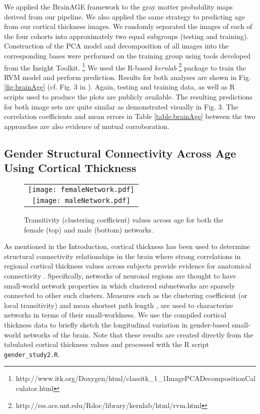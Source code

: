 We applied the BrainAGE framework to the gray matter probability maps derived
from our pipeline.  We also applied the same strategy to predicting age from 
our cortical thickness images.  We randomly separated the images of each of the 
four cohorts into approximately two equal subgroups (testing and training).
Construction of the PCA model and decomposition of all images into the corresponding 
bases were performed on the training group using tools developed from the Insight Toolkit.%
\footnote{
http://www.itk.org/Doxygen/html/classitk\_1\_1ImagePCADecompositionCalculator.html  
}
We used the R-based {\it kernlab}%
\footnote{
http://rss.acs.unt.edu/Rdoc/library/kernlab/html/rvm.html
} 
package to train the RVM model and perform prediction.  Results for both
analyses  are shown in Fig. \ref{fig:brainAge} (cf. Fig. 3 in \cite{franke2010}).
Again, testing and training data, as well as 
R scripts used to produce the 
plots are publicly available.  
The resulting predictions for both image sets are quite similar as demonstrated 
visually in Fig. 3.  The correlation coefficients and mean errors in Table 
\ref{table:brainAge} between the
two approaches are also evidence of mutual corroboration.

\subsection{Gender Structural Connectivity Across Age Using Cortical Thickness}

\begin{figure*}
  \centering
  \begin{tabular}{c}
  \texttt{[image: femaleNetwork.pdf]} \\
  \texttt{[image: maleNetwork.pdf]}
  \end{tabular}
  \caption{Transitivity (clustering coefficient) values across age for both the female (top)
  and male (bottom) networks.  
  }
  \label{fig:network}
\end{figure*}

As mentioned in the Introduction, cortical thickness has
been used to determine structural connectivity relationships in the brain 
where strong correlations in regional cortical 
thickness values across subjects provide evidence for anatomical
connectivity \citep{he2007,chen2008,he2008}.  Specifically, networks of neuronal
regions are thought to have small-world network properties \citep{sporns2004} 
in which clustered subnetworks are sparsely connected to other such clusters.
Measures such as the
clustering coefficient (or local transitivity) and mean shortest path length
\citep{watts1998}, are used to characterize networks in terms of their 
small-worldness.
We use the compiled cortical thickness data to briefly sketch
the longitudinal variation in gender-based small-world networks of the
brain.  Note that these results are created directly from the tabulated 
cortical thickness values and processed with the R script
\verb#gender_study2.R#.

